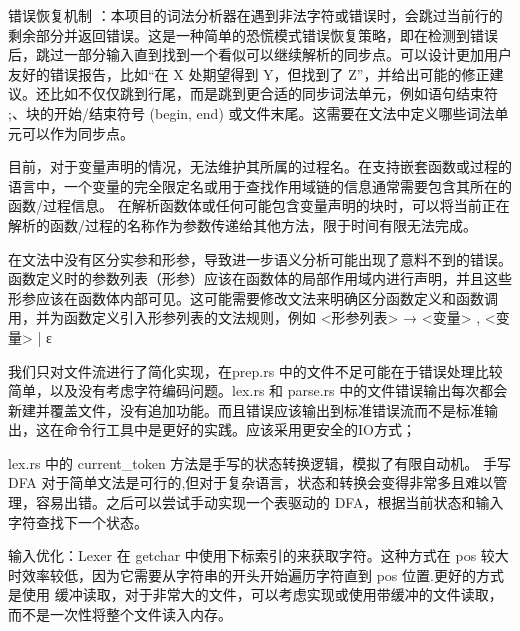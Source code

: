 错误恢复机制 ：本项目的词法分析器在遇到非法字符或错误时，会跳过当前行的剩余部分并返回错误。这是一种简单的恐慌模式错误恢复策略，即在检测到错误后，跳过一部分输入直到找到一个看似可以继续解析的同步点。可以设计更加用户友好的错误报告，比如“在 X 处期望得到 Y，但找到了 Z”，并给出可能的修正建议。还比如不仅仅跳到行尾，而是跳到更合适的同步词法单元，例如语句结束符 ;、块的开始/结束符号 (begin, end) 或文件末尾。这需要在文法中定义哪些词法单元可以作为同步点。

目前，对于变量声明的情况，无法维护其所属的过程名。在支持嵌套函数或过程的语言中，一个变量的完全限定名或用于查找作用域链的信息通常需要包含其所在的函数/过程信息。 在解析函数体或任何可能包含变量声明的块时，可以将当前正在解析的函数/过程的名称作为参数传递给其他方法，限于时间有限无法完成。

在文法中没有区分实参和形参，导致进一步语义分析可能出现了意料不到的错误。函数定义时的参数列表（形参）应该在函数体的局部作用域内进行声明，并且这些形参应该在函数体内部可见。这可能需要修改文法来明确区分函数定义和函数调用，并为函数定义引入形参列表的文法规则，例如 <形参列表> → <变量> { , <变量> } | ε

我们只对文件流进行了简化实现，在prep.rs 中的文件不足可能在于错误处理比较简单，以及没有考虑字符编码问题。lex.rs 和 parse.rs 中的文件错误输出每次都会新建并覆盖文件，没有追加功能。而且错误应该输出到标准错误流而不是标准输出，这在命令行工具中是更好的实践。应该采用更安全的IO方式；

lex.rs 中的 current_token 方法是手写的状态转换逻辑，模拟了有限自动机。
手写 DFA 对于简单文法是可行的,但对于复杂语言，状态和转换会变得非常多且难以管理，容易出错。之后可以尝试手动实现一个表驱动的 DFA，根据当前状态和输入字符查找下一个状态。

输入优化：Lexer 在 getchar 中使用下标索引的来获取字符。这种方式在 pos 较大时效率较低，因为它需要从字符串的开头开始遍历字符直到 pos 位置.更好的方式是使用 
缓冲读取，对于非常大的文件，可以考虑实现或使用带缓冲的文件读取，而不是一次性将整个文件读入内存。
